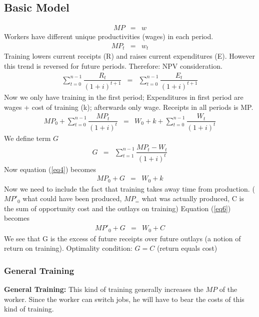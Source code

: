 \documentclass[12pt,a4paper]{article}
\begin{document}
  \subsection{Basic Model} %
  \label{sec:model}
  \begin{eqnarray}
    MP &=& w
  \end{eqnarray}
  Workers have different unique productivities (wages) in each period.
  \begin{eqnarray}
    MP_{t}&=&w_{t}
  \end{eqnarray}
  Training lowers current receipts (R) and raises current expenditures
  (E). However this trend is reversed for future periods. Therefore: NPV
  consideration.
  \begin{eqnarray}
    \sum_{t=0}^{n-1} \dfrac{R_t}{(1+i)^{t+1}} &=& \sum_{t=0}^{n-1}
    \dfrac{E_t}{(1+i)^{t+1}}
  \end{eqnarray}
  Now we only have training in the first period; Expenditures in first
  period are wages + cost of training (k); afterwards only wage. Receipts
  in all periods is MP.
  \begin{eqnarray}
    MP_0 + \sum_{t=0}^{n-1} \dfrac{MP_t}{(1+i)^{t}} &=& W_0 + k +
    \sum_{t=0}^{n-1} \dfrac{W_t}{(1+i)^{t}} \label{eq4}
  \end{eqnarray}
  We define term $G$
  \begin{eqnarray}
    G&=& \sum_{t=1}^{n-1} \dfrac{MP_t - W_t}{(1+i)^{t}}
  \end{eqnarray}
  Now equation (\ref{eq4}) becomes
  \begin{eqnarray}
    MP_0 + G &=& W_0 + k \label{eq6}
  \end{eqnarray}
  Now we need to include the fact that training takes away time from
  production. ($MP'_0$ what could have been produced, $MP_=$ what was
  actually produced, C is the sum of opportunity cost and the outlays on
  training) Equation (\ref{eq6}) becomes
  \begin{eqnarray}
    MP'_0 + G &=& W_0 + C \label{eq7}
  \end{eqnarray}
  We see that G is the excess of future receipts over future outlays (a
  notion of return on training). Optimality condition: $G=C$ (return
  equals cost)

  \subsubsection{General Training} %
  \label{sub:general_training}
  \textbf{General Training:} This kind of training generally increases
  the $MP$ of the worker. Since the worker can switch jobs, he will
  have to bear the costs of this kind of training.
\end{document}
